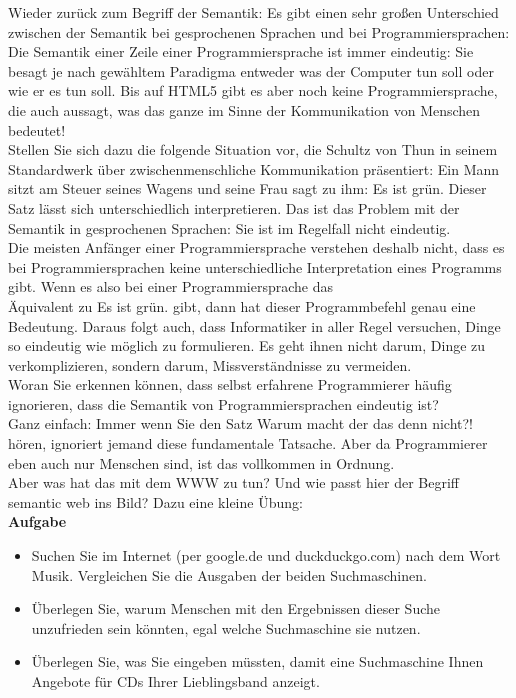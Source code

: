 Wieder zurück zum Begriff der Semantik: Es gibt einen sehr großen Unterschied zwischen der Semantik bei gesprochenen Sprachen und bei Programmiersprachen: Die Semantik einer Zeile einer Programmiersprache ist immer eindeutig: Sie besagt je nach gewähltem Paradigma entweder was der Computer tun soll oder wie er es tun soll. Bis auf HTML5 gibt es aber noch keine Programmiersprache, die auch aussagt, was das ganze im Sinne der Kommunikation von Menschen bedeutet!\\

Stellen Sie sich dazu die folgende Situation vor, die Schultz von Thun in seinem Standardwerk über zwischenmenschliche Kommunikation präsentiert: Ein Mann sitzt am Steuer seines Wagens und seine Frau sagt zu ihm: \glqq{}Es ist grün.\grqq{} Dieser Satz lässt sich unterschiedlich interpretieren. Das ist das Problem mit der Semantik in gesprochenen Sprachen: Sie ist im Regelfall nicht eindeutig.\\

Die meisten Anfänger einer Programmiersprache verstehen deshalb nicht, dass es bei Programmiersprachen keine unterschiedliche Interpretation eines Programms gibt. Wenn es also bei einer Programmiersprache das\\ Äquivalent zu \glqq{}Es ist grün.\grqq{} gibt, dann hat dieser Programmbefehl genau eine Bedeutung. Daraus folgt auch, dass Informatiker in aller Regel versuchen, Dinge so eindeutig wie möglich zu formulieren. Es geht ihnen nicht darum, Dinge zu verkomplizieren, sondern darum, Missverständnisse zu vermeiden.\\

Woran Sie erkennen können, dass selbst erfahrene Programmierer häufig ignorieren, dass die Semantik von Programmiersprachen eindeutig ist?\\ Ganz einfach: Immer wenn Sie den Satz \glqq{}Warum macht der das denn nicht?!\grqq{} hören, ignoriert jemand diese fundamentale Tatsache. Aber da Programmierer eben auch nur Menschen sind, ist das vollkommen in Ordnung.\\

Aber was hat das mit dem WWW zu tun? Und wie passt hier der Begriff semantic web ins Bild? Dazu eine kleine Übung:\\

\textbf{Aufgabe}

\begin{itemize}
	\item Suchen Sie im Internet (per google.de und duckduckgo.com) nach dem Wort Musik. Vergleichen Sie die Ausgaben der beiden Suchmaschinen. 
	\item Überlegen Sie, warum Menschen mit den Ergebnissen dieser Suche unzufrieden sein könnten, egal welche Suchmaschine sie nutzen.
	\item Überlegen Sie, was Sie eingeben müssten, damit eine Suchmaschine Ihnen Angebote für CDs Ihrer Lieblingsband anzeigt.
\end{itemize}

